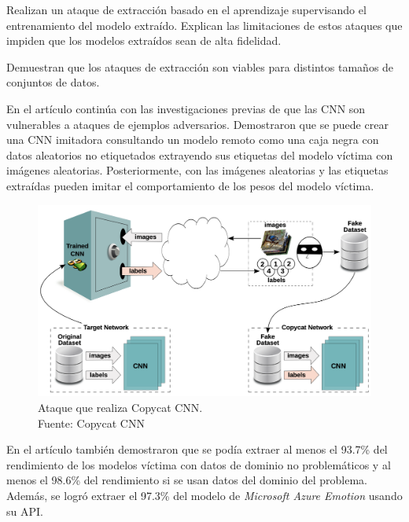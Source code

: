 Realizan un ataque de extracción basado en el aprendizaje supervisando el entrenamiento del modelo extraído. Explican las limitaciones de estos ataques que impiden que los modelos extraídos sean de alta fidelidad.

Demuestran que los ataques de extracción son viables para distintos tamaños de conjuntos de datos.

En el artículo \cite{Correia_Silva_2018} continúa con las investigaciones previas de que las \gls{CNN} son vulnerables a ataques de ejemplos adversarios. Demostraron que se puede crear una \gls{CNN} imitadora consultando un modelo remoto como una caja negra con datos aleatorios no etiquetados extrayendo sus etiquetas del modelo víctima con imágenes aleatorias. Posteriormente, con las imágenes aleatorias y las etiquetas extraídas pueden imitar el comportamiento de los pesos del modelo víctima.

\begin{figure}[H]
    \centering
    \includegraphics[width=0.75\linewidth]{figures/chapter02/copycatCNN.png}
    \caption{Ataque que realiza Copycat CNN. \\Fuente: Copycat CNN \cite{Correia_Silva_2018}}
    \label{fig:copycatcnn}
\end{figure}

En el artículo también demostraron que se podía extraer al menos el 93.7\% del rendimiento de los modelos víctima con datos de dominio no problemáticos y al menos el 98.6\% del rendimiento si se usan datos del dominio del problema. Además, se logró extraer el 97.3\% del modelo de \textit{Microsoft Azure Emotion} usando su API.

